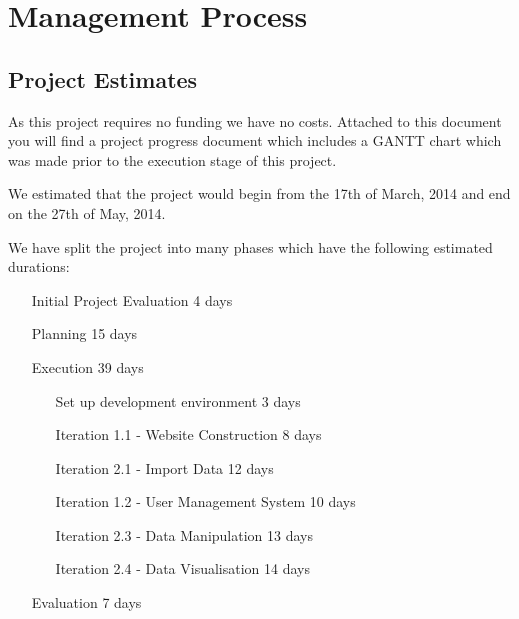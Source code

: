 
\chapter{Management Process} %

\label{Part6Chapter4} %



\section{Project Estimates}

As this project requires no funding we have no costs. Attached to this document you will find a project progress document which includes a GANTT chart which was made prior to the execution stage of this project.

We estimated that the project would begin from the 17th of March, 2014 and end on the 27th of May, 2014.

We have split the project into many phases which have the following estimated durations:
\begin{itemize}
	\item [Initial Project Evaluation] 4 days
	\item [Planning] 15 days
	\item [Execution] 39 days
	\begin{itemize}
		\item [Set up development environment] 3 days
		\item [Iteration 1.1 - Website Construction] 8 days
		\item [Iteration 2.1 - Import Data] 12 days
		\item [Iteration 1.2 - User Management System] 10 days
		\item [Iteration 2.3 - Data Manipulation] 13 days
		\item [Iteration 2.4 - Data Visualisation] 14 days
	\end{itemize}
	\item [Evaluation] 7 days
\end{itemize}

